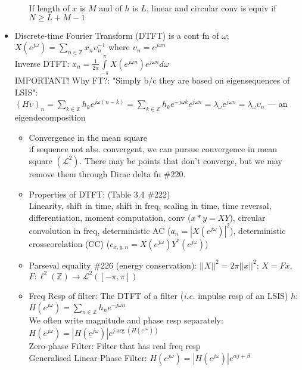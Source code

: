 \documentclass{article}
\newcommand{\ie}{\textit{i.e. }}
\newcommand{\cg}{\color{gray}}
\begin{document}
\begin{itemize}
\begin{itemize}
	{\color{gray} If length of $x$ is $M$ and of $h$ is $L$, linear and circular conv is equiv if $N\ge L+M-1$}
\end{itemize}
\item Discrete-time Fourier Transform (DTFT) {\color{gray} is a cont fn of $\omega$; $X(e^{j\omega})=\sum_{n\in\mathbb{Z}}x_n {\upsilon^{-1}_{n}}$ where $\upsilon_n=e^{j\omega n}$} \\
Inverse DTFT: {\cg $x_n=\frac{1}{2\pi}\int\limits_{-\pi}^{\pi}X(e^{j\omega n})e^{j\omega n}d\omega$}\\
{\color{gray} \footnotesize
IMPORTANT! Why FT?: "Simply b/c they are based on eigensequences of LSIS":\\
$(H\upsilon)_n=\sum_{k\in\mathbb{Z}}h_k e^{j\omega (n-k)} = \sum_{k\in\mathbb{Z}}h_k e^{-j\omega k} e^{j\omega n} = \lambda_{\omega} e^{j\omega n} = \lambda_{\omega} \upsilon_n$ \---- an eigendecomposition
}
\begin{itemize}
\item Convergence in the mean square  \\
{\color{gray} \footnotesize if sequence not abs. convergent, we can pursue convergence in mean square $(\mathcal{L}^2)$. There may be points that don't converge, but we may remove them through Dirac delta fn \#220}.
\item Properties of DTFT: (Table 3.4 \#222) \\
{\color{gray}\footnotesize 
Linearity, shift in time, shift in freq, scaling in time, time reversal, differentiation, moment computation, conv ($x\ast y=XY$), circular convolution in freq, deterministic AC ($a_n=|X(e^{j\omega})|^2$), deterministic crosscorelation (CC) ($c_{x,y,n}=X(e^{j\omega})Y^{*}(e^{j\omega})$)}
\item Parseval equality \#226 (energy conservation): {\color{gray} $||X||^2=2\pi ||x||^2$; $X=Fx$, $F:\ell^2(\mathbb{Z})\rightarrow \mathcal{L}^2([-\pi,\pi])$ }
\item Freq Resp of filter: {\color{gray} The DTFT of a filter (\ie impulse resp of an LSIS) $h$: $H(e^{j\omega})=\sum_{n\in \mathbb{Z}} h_n e^{-j\omega n}$}\\
{\color{gray}\footnotesize
We often write magnitude and phase resp separately: $H(e^{j\omega})=|H(e^{j\omega})|e^{j\arg(H(e^{j\omega}))}$
\\
{Zero-phase Filter: Filter that has real freq resp\\
Generalised Linear-Phase Filter: $H(e^{j\omega})=|H(e^{j\omega})|e^{\alpha j+\beta}$ \\
}}
\end{itemize}
\end{itemize}
\end{document}
